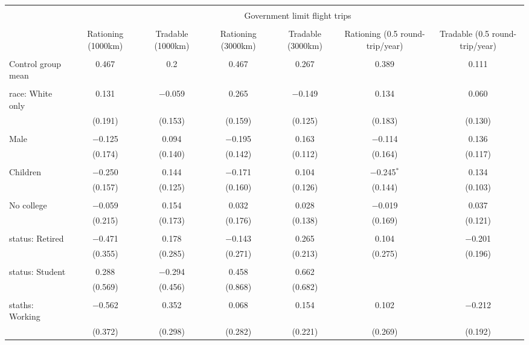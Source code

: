 
\begin{tabular}{@{\extracolsep{5pt}}lcccccc} 
\\[-1.8ex]\hline 
\hline \\[-1.8ex] 
 & \multicolumn{6}{c}{Government limit flight trips} \\ 
\cline{2-7} 
\\[-1.8ex] & Rationing (1000km) & Tradable (1000km) & Rationing (3000km) & Tradable (3000km) & Rationing (0.5 round-trip/year) & Tradable (0.5 round-trip/year) \\ 
\hline \\[-1.8ex] 
 Control group mean & 0.467 & 0.2 & 0.467 & 0.267 & 0.389 & 0.111  \\ \hline \\[-1.8ex] race: White only & 0.131 & $-$0.059 & 0.265 & $-$0.149 & 0.134 & 0.060 \\ 
  & (0.191) & (0.153) & (0.159) & (0.125) & (0.183) & (0.130) \\ 
  & & & & & & \\ 
 Male & $-$0.125 & 0.094 & $-$0.195 & 0.163 & $-$0.114 & 0.136 \\ 
  & (0.174) & (0.140) & (0.142) & (0.112) & (0.164) & (0.117) \\ 
  & & & & & & \\ 
 Children & $-$0.250 & 0.144 & $-$0.171 & 0.104 & $-$0.245$^{*}$ & 0.134 \\ 
  & (0.157) & (0.125) & (0.160) & (0.126) & (0.144) & (0.103) \\ 
  & & & & & & \\ 
 No college & $-$0.059 & 0.154 & 0.032 & 0.028 & $-$0.019 & 0.037 \\ 
  & (0.215) & (0.173) & (0.176) & (0.138) & (0.169) & (0.121) \\ 
  & & & & & & \\ 
 status: Retired & $-$0.471 & 0.178 & $-$0.143 & 0.265 & 0.104 & $-$0.201 \\ 
  & (0.355) & (0.285) & (0.271) & (0.213) & (0.275) & (0.196) \\ 
  & & & & & & \\ 
 status: Student & 0.288 & $-$0.294 & 0.458 & 0.662 &  &  \\ 
  & (0.569) & (0.456) & (0.868) & (0.682) &  &  \\ 
  & & & & & & \\ 
 staths: Working & $-$0.562 & 0.352 & 0.068 & 0.154 & 0.102 & $-$0.212 \\ 
  & (0.372) & (0.298) & (0.282) & (0.221) & (0.269) & (0.192) \\ 

\end{tabular}
